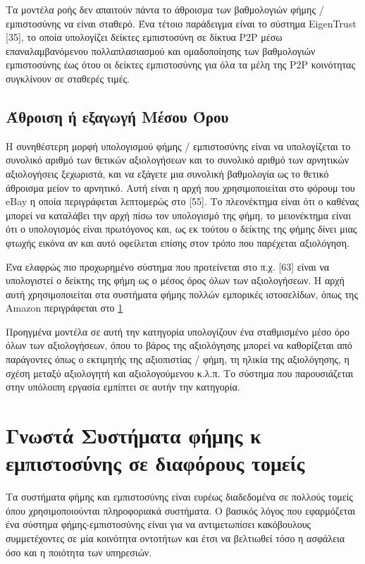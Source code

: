Τα μοντέλα ροής δεν απαιτούν πάντα το άθροισμα των βαθμολογιών φήμης / εμπιστοσύνης να είναι σταθερό. Ένα τέτοιο παράδειγμα είναι το σύστημα EigenTrust [35], το οποία υπολογίζει δείκτες εμπιστοσύνη σε δίκτυα P2P μέσω επαναλαμβανόμενου πολλαπλασιασμού και  ομαδοποίησης των βαθμολογιών εμπιστοσύνης έως ότου οι δείκτες εμπιστοσύνης για όλα τα μέλη της P2P κοινότητας συγκλίνουν σε σταθερές τιμές.

\subsection{Άθροιση ή εξαγωγή Μέσου Όρου}

Η συνηθέστερη μορφή υπολογισμού φήμης / εμπιστοσύνης είναι να υπολογίζεται το συνολικό αριθμό των θετικών αξιολογήσεων και το συνολικό αριθμό των αρνητικών αξιολογήσεις ξεχωριστά, και να εξάγετε μια συνολική βαθμολογία ως το θετικό άθροισμα μείον το αρνητικό. Αυτή είναι η αρχή που χρησιμοποιείται στο φόρουμ του eBay η οποία περιγράφεται λεπτομερώς στο [55]. Το πλεονέκτημα είναι ότι ο καθένας μπορεί να καταλάβει την αρχή πίσω τον υπολογισμό της φήμη, το μειονέκτημα είναι ότι ο υπολογισμός είναι πρωτόγονος και, ως εκ τούτου ο δείκτης της φήμης δίνει μιας φτωχής εικόνα αν και αυτό οφείλεται επίσης στον τρόπο που παρέχεται αξιολόγηση.

Ένα ελαφρώς πιο προχωρημένο σύστημα που προτείνεται στο π.χ. [63] είναι να υπολογιστεί ο δείκτης της φήμη ως ο μέσος όρος όλων των αξιολογήσεων. Η αρχή αυτή χρησιμοποιείται στα συστήματα φήμης πολλών εμπορικές ιστοσελίδων, όπως  της Amazon περιγράφεται στο \ref{sec:prev}

Προηγμένα μοντέλα σε αυτή την κατηγορία υπολογίζουν ένα σταθμισμένο μέσο όρο όλων των αξιολογήσεων, όπου το βάρος της αξιολόγησης μπορεί να καθορίζεται από παράγοντες όπως ο εκτιμητής της αξιοπιστίας / φήμη, τη ηλικία της αξιολόγησης, η σχέση μεταξύ αξιολογητή και αξιολογούμενου κ.λ.π. Το σύστημα που παρουσιάζεται στην υπόλοιπη εργασία εμπίπτει σε αυτήν την κατηγορία.
\newpage
\section{Γνωστά Συστήματα φήμης κ εμπιστοσύνης σε διαφόρους τομείς}\label{sec:prev}

Τα συστήματα φήμης και εμπιστοσύνης είναι ευρέως διαδεδομένα σε πολλούς τομείς όπου χρησιμοποιούνται πληροφοριακά συστήματα. Ο βασικός λόγος που εφαρμόζεται ένα σύστημα φήμης-εμπιστοσύνης είναι για να αντιμετωπίσει κακόβουλους συμμετέχοντες σε μία κοινότητα οντοτήτων και έτσι να βελτιωθεί τόσο η ασφάλεια όσο και η ποιότητα των υπηρεσιών.

